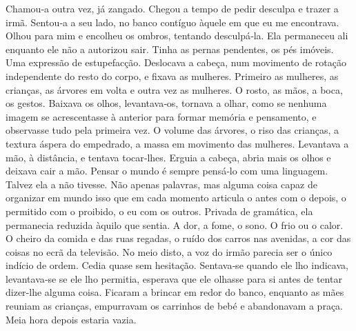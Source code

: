 Chamou­‑a outra vez, já zangado. Chegou a tempo de pedir desculpa e
trazer a irmã. Sentou­‑a a seu lado, no banco contíguo àquele em que eu
me encontrava. Olhou para mim e encolheu os ombros, tentando
desculpá­‑la. Ela permaneceu ali enquanto ele não a autorizou sair.
Tinha as pernas pendentes, os pés imóveis. Uma expressão de
estupefacção. Deslocava a cabeça, num movimento de rotação independente
do resto do corpo, e fixava as mulheres. Primeiro as mulheres, as
crianças, as árvores em volta e outra vez as mulheres. O rosto, as mãos,
a boca, os gestos. Baixava os olhos, levantava­‑os, tornava a olhar,
como se nenhuma imagem se acrescentasse à anterior para formar memória e
pensamento, e observasse tudo pela primeira vez. O volume das árvores, o
riso das crianças, a textura áspera do empedrado, a massa em movimento
das mulheres. Levantava a mão, à distância, e tentava tocar­‑lhes.
Erguia a cabeça, abria mais os olhos e deixava cair a mão. Pensar o
mundo é sempre pensá­‑lo com uma linguagem. Talvez ela a não tivesse.
Não apenas palavras, mas alguma coisa capaz de organizar em mundo isso
que em cada momento articula o antes com o depois, o permitido com o
proibido, o eu com os outros. Privada de gramática, ela permanecia
reduzida àquilo que sentia. A dor, a fome, o sono. O frio ou o calor. O
cheiro da comida e das ruas regadas, o ruído dos carros nas avenidas, a
cor das coisas no ecrã da televisão. No meio disto, a voz do irmão
parecia ser o único indício de ordem. Cedia quase sem hesitação.
Sentava­‑se quando ele lho indicava, levantava­‑se se ele lho permitia,
esperava que ele olhasse para si antes de tentar dizer­‑lhe alguma
coisa. Ficaram a brincar em redor do banco, enquanto as mães reuniam as
crianças, empurravam os carrinhos de bebé e abandonavam a praça. Meia
hora depois estaria vazia.


